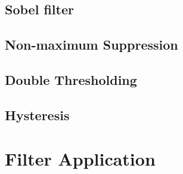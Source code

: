 \subsection{Sobel filter}
\label{subsec:sobel}


\subsection{Non-maximum Suppression}
\label{subsec:non-maximum-suppression}

\subsection{Double Thresholding}
\label{subsec:double-thresholding}

\subsection{Hysteresis}
\label{subsec:hysteresis}

\section{Filter Application}
\label{sec:filterapp}


